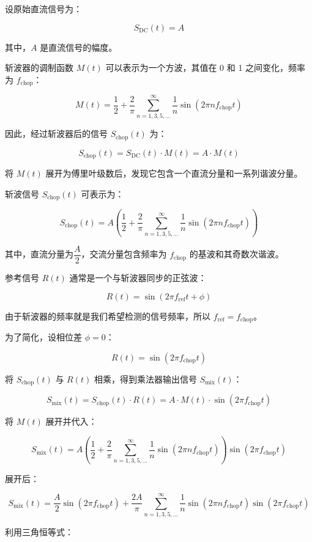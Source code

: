 \documentclass[dvipsnames, svgnames,a4paper,11pt]{article}
\begin{document}
设原始直流信号为：

\[
S_{\text{DC}}(t) = A
\]

其中，\( A \) 是直流信号的幅度。

斩波器的调制函数 \( M(t) \) 可以表示为一个方波，其值在 0 和 1 之间变化，频率为 \( f_{\text{chop}} \)：

\[
M(t) = \dfrac{1}{2} + \dfrac{2}{\pi} \sum_{n=1,3,5,\dots}^{\infty} \dfrac{1}{n} \sin(2\pi n f_{\text{chop}} t)
\]

因此，经过斩波器后的信号 \( S_{\text{chop}}(t) \) 为：

\[
S_{\text{chop}}(t) = S_{\text{DC}}(t) \cdot M(t) = A \cdot M(t)
\]

将 \( M(t) \) 展开为傅里叶级数后，发现它包含一个直流分量和一系列谐波分量。

斩波信号 \( S_{\text{chop}}(t) \) 可表示为：

\[
S_{\text{chop}}(t) = A \left( \dfrac{1}{2} + \dfrac{2}{\pi} \sum_{n=1,3,5,\dots}^{\infty} \dfrac{1}{n} \sin(2\pi n f_{\text{chop}} t) \right)
\]

其中，直流分量为\( \dfrac{A}{2} \)，交流分量包含频率为 \( f_{\text{chop}} \) 的基波和其奇数次谐波。

参考信号 \( R(t) \) 通常是一个与斩波器同步的正弦波：

\[
R(t) = \sin(2\pi f_{\text{ref}} t + \phi)
\]

由于斩波器的频率就是我们希望检测的信号频率，所以 \( f_{\text{ref}} = f_{\text{chop}} \)。

为了简化，设相位差 \( \phi = 0 \)：

\[
R(t) = \sin(2\pi f_{\text{chop}} t)
\]

将 \( S_{\text{chop}}(t) \) 与 \( R(t) \) 相乘，得到乘法器输出信号 \( S_{\text{mix}}(t) \)：

\[
S_{\text{mix}}(t) = S_{\text{chop}}(t) \cdot R(t) = A \cdot M(t) \cdot \sin(2\pi f_{\text{chop}} t)
\]

将 \( M(t) \) 展开并代入：

\[
S_{\text{mix}}(t) = A \left( \dfrac{1}{2} + \dfrac{2}{\pi} \sum_{n=1,3,5,\dots}^{\infty} \dfrac{1}{n} \sin(2\pi n f_{\text{chop}} t) \right) \sin(2\pi f_{\text{chop}} t)
\]

展开后：

\[
S_{\text{mix}}(t) = \dfrac{A}{2} \sin(2\pi f_{\text{chop}} t) + \dfrac{2A}{\pi} \sum_{n=1,3,5,\dots}^{\infty} \dfrac{1}{n} \sin(2\pi n f_{\text{chop}} t) \sin(2\pi f_{\text{chop}} t)
\]

利用三角恒等式：
\end{document}
